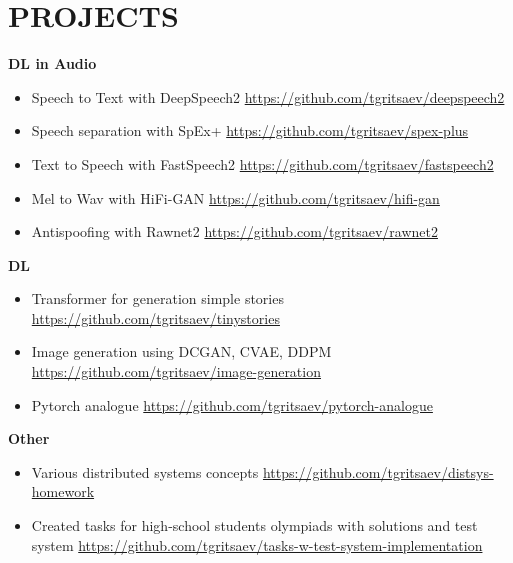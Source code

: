 \section*{PROJECTS}
\noindent

\textbf{DL in Audio}
\begin{itemize}
\item Speech to Text with DeepSpeech2 \url{https://github.com/tgritsaev/deepspeech2} 
\item Speech separation with {SpEx+} \url{https://github.com/tgritsaev/spex-plus} 
\item Text to Speech with {FastSpeech2} \url{https://github.com/tgritsaev/fastspeech2} 
\item Mel to Wav with {HiFi-GAN} \url{https://github.com/tgritsaev/hifi-gan} 
\item Antispoofing with {Rawnet2} \url{https://github.com/tgritsaev/rawnet2} 
\end{itemize}

\textbf{DL}
\begin{itemize}
\item {Transformer for generation simple stories} \url{https://github.com/tgritsaev/tinystories}
\item {Image generation using DCGAN, CVAE, DDPM} \url{https://github.com/tgritsaev/image-generation}
\item {Pytorch analogue} \url{https://github.com/tgritsaev/pytorch-analogue}
\end{itemize}
\textbf{Other}
\begin{itemize}
    \item Various distributed systems concepts \url{https://github.com/tgritsaev/distsys-homework}
    \item {Created tasks for high-school students olympiads with solutions and test system} \url{https://github.com/tgritsaev/tasks-w-test-system-implementation}
\end{itemize}
